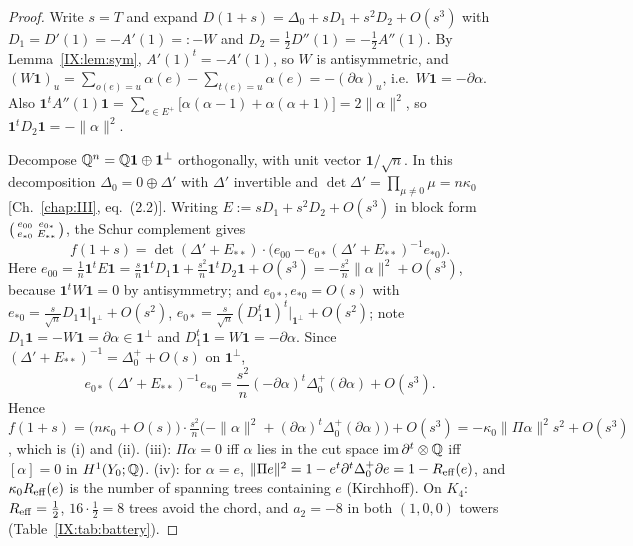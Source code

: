 \begin{proof}
Write $s=T$ and expand $D(1+s)=\Delta_0+sD_1+s^{2}D_2+O(s^{3})$ with
$D_1=D'(1)=-A'(1)=:-W$ and $D_2=\frac12D''(1)=-\frac12A''(1)$. By
Lemma~\ref{IX:lem:sym}, $A'(1)^{t}=-A'(1)$, so $W$ is antisymmetric, and
$(W\mathbf1)_u=\sum_{o(e)=u}\alpha(e)-\sum_{t(e)=u}\alpha(e)=-(\partial\alpha)_u$, i.e.\
$W\mathbf1=-\partial\alpha$. Also
$\mathbf1^{t}A''(1)\mathbf1=\sum_{e\in E^+}\bigl[\alpha(\alpha-1)+\alpha(\alpha+1)\bigr]
=2\|\alpha\|^{2}$, so $\mathbf1^{t}D_2\mathbf1=-\|\alpha\|^{2}$.

Decompose $\mathbb{Q}^{n}=\mathbb{Q}\mathbf1\oplus\mathbf1^{\perp}$ orthogonally, with unit vector
$\mathbf1/\sqrt n$. In this decomposition $\Delta_0=0\oplus\Delta'$ with $\Delta'$
invertible and $\det\Delta'=\prod_{\mu\neq0}\mu=n\kappa_0$ [Ch.~\ref{chap:III}, eq.~(2.2)]. Writing
$E:=sD_1+s^{2}D_2+O(s^{3})$ in block form $\begin{psmallmatrix}e_{00}&e_{0*}\\
e_{*0}&E_{**}\end{psmallmatrix}$, the Schur complement gives
\[
f(1+s)=\det(\Delta'+E_{**})\cdot\bigl(e_{00}-e_{0*}(\Delta'+E_{**})^{-1}e_{*0}\bigr).
\]
Here $e_{00}=\frac1n\mathbf1^{t}E\mathbf1=\frac{s}{n}\mathbf1^{t}D_1\mathbf1
+\frac{s^{2}}n\mathbf1^{t}D_2\mathbf1+O(s^{3})=-\frac{s^{2}}n\|\alpha\|^{2}+O(s^{3})$,
because $\mathbf1^{t}W\mathbf1=0$ by antisymmetry; and $e_{0*},e_{*0}=O(s)$ with
$e_{*0}=\frac{s}{\sqrt n}D_1\mathbf1|_{\mathbf1^\perp}+O(s^{2})$,
$e_{0*}=\frac{s}{\sqrt n}(D_1^{t}\mathbf1)^{t}|_{\mathbf1^\perp}+O(s^{2})$; note
$D_1\mathbf1=-W\mathbf1=\partial\alpha\in\mathbf1^{\perp}$ and
$D_1^{t}\mathbf1=W\mathbf1=-\partial\alpha$. Since $(\Delta'+E_{**})^{-1}=\Delta_0^{+}
+O(s)$ on $\mathbf1^{\perp}$,
\[
e_{0*}(\Delta'+E_{**})^{-1}e_{*0}
=\frac{s^{2}}n(-\partial\alpha)^{t}\Delta_0^{+}(\partial\alpha)+O(s^{3}) .
\]
Hence
$f(1+s)=\bigl(n\kappa_0+O(s)\bigr)\cdot\frac{s^{2}}{n}\bigl(-\|\alpha\|^{2}
+(\partial\alpha)^{t}\Delta_0^{+}(\partial\alpha)\bigr)+O(s^{3})
=-\kappa_0\|\Pi\alpha\|^{2}s^{2}+O(s^{3})$, which is (i) and (ii). (iii): $\Pi\alpha=0$
iff $\alpha$ lies in the cut space $\operatorname{im}\partial^{t}\otimes\mathbb{Q}$ iff
$[\alpha]=0$ in $H^{1}(Y_0;\mathbb{Q})$. (iv): for $\alpha=e$,
$\|\Pi e\|^{2}=1-e^{t}\partial^{t}\Delta_0^{+}\partial e=1-R_{\mathrm{eff}}(e)$, and
$\kappa_0R_{\mathrm{eff}}(e)$ is the number of spanning trees containing $e$ (Kirchhoff). On $K_4$:
$R_{\mathrm{eff}}=\frac12$, $16\cdot\frac12=8$ trees avoid the chord, and $a_2=-8$ in both
$(1,0,0)$ towers (Table~\ref{IX:tab:battery}).
\end{proof}

